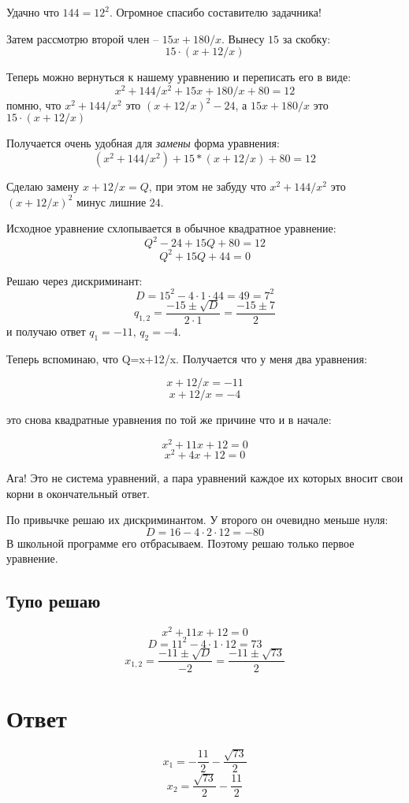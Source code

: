 \documentclass{article}
\begin{document}
Удачно что ${144=12^2}$. Огромное спасибо составителю задачника!

Затем рассмотрю второй член -- ${15x+180/x}$. Вынесу $15$ за скобку:
$$15\cdot(x+12/x)$$

Теперь можно вернуться к нашему уравнению и переписать его в виде:
$$ x^2+144/x^2+15x+180/x+80=12 $$
помню, что $x^2+144/x^2$ это $(x+12/x)^2-24$, а $15x+180/x$ это $15\cdot(x+12/x)$

Получается очень удобная для \textit{замены} форма уравнения:
$$ (x^2+144/x^2)+15*(x+12/x)+80=12 $$

Сделаю замену ${x+12/x=Q}$, при этом не забуду что $ x^2+144/x^2$ это $(x+12/x)^2$ минус лишние $24$.

\begin{samepage}
Исходное уравнение схлопывается в обычное квадратное уравнение:
$$Q^2-24+15Q+80=12$$
$$Q^2+15Q+44=0$$

Решаю через дискриминант:
$$D=15^2-4\cdot 1 \cdot 44=49=7^2$$
$$q_{1,2}=\frac{-15\pm \sqrt{D}}{2\cdot 1}=\frac{-15\pm 7}{2}$$
и получаю ответ $q_1=-11$, $q_2=-4$.
\end{samepage}

Теперь вспоминаю, что Q=x+12/x. Получается что у меня два уравнения:

$$ x+12/x=-11 $$
$$ x+12/x= -4 $$

это снова квадратные уравнения по той же причине что и в начале:

$$ x^2+11x+12=0 $$
$$ x^2+ 4x+12=0 $$

Ага! Это не система уравнений, а пара уравнений каждое их которых вносит свои корни в окончательный ответ.

По привычке решаю их дискриминантом. У второго он очевидно меньше нуля:
$${D=16-4\cdot 2\cdot 12=-80}$$
В школьной программе его отбрасываем. Поэтому решаю только первое уравнение.

\subsection{Тупо решаю}
$$ x^2+11x+12=0 $$
$$D=11^2-4\cdot 1 \cdot 12=73$$
$$x_{1,2}=\frac{-11\pm \sqrt{D}}{-2}=\frac{-11\pm \sqrt{73}}{2}$$

\section{Ответ}
$$x_1=-\frac{11}{2}-\frac{\sqrt{73}}{2}$$
$$x_2=\frac{\sqrt{73}}{2}-\frac{11}{2}$$
\end{document}

